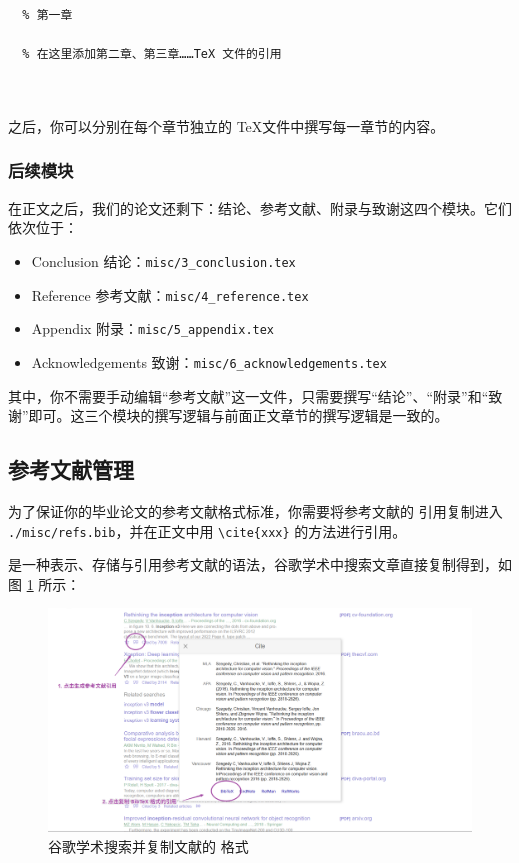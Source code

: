 \begin{verbatim}
  % 第一章
  
  % 在这里添加第二章、第三章……TeX 文件的引用
  
  
\end{verbatim}

之后，你可以分别在每个章节独立的 \TeX 文件中撰写每一章节的内容。

\subsubsection{后续模块}

在正文之后，我们的论文还剩下：结论、参考文献、附录与致谢这四个模块。它们依次位于：

\begin{itemize}
  \item Conclusion 结论：\texttt{misc/3\_conclusion.tex}
  \item Reference 参考文献：\texttt{misc/4\_reference.tex}
  \item Appendix 附录：\texttt{misc/5\_appendix.tex}
  \item Acknowledgements 致谢：\texttt{misc/6\_acknowledgements.tex}
\end{itemize}

其中，你不需要手动编辑“参考文献”这一文件，只需要撰写“结论”、“附录”和“致谢”即可。这三个模块的撰写逻辑与前面正文章节的撰写逻辑是一致的。


\subsection{参考文献管理}

为了保证你的毕业论文的参考文献格式标准，你需要将参考文献的  引用复制进入 \texttt{./misc/refs.bib}，并在正文中用 \verb|\cite{xxx}| 的方法进行引用。

 是一种表示、存储与引用参考文献的语法，谷歌学术中搜索文章直接复制得到，如图 \ref{google_scholar} 所示：

\begin{figure}[H]
  \center
  \includegraphics[width=\textwidth]{images/google_scholar.png}
  \caption{谷歌学术搜索并复制文献的  格式}
  \label{google_scholar}
\end{figure}

